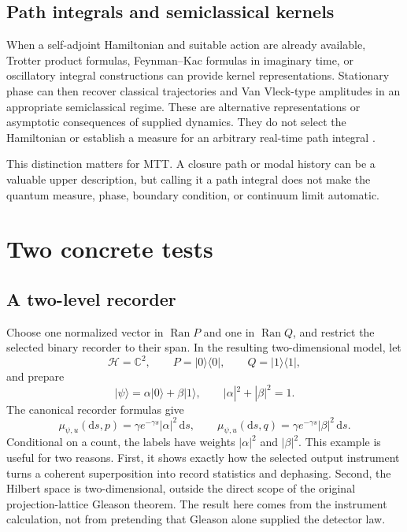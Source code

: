 \documentclass[11pt]{article}
\theoremstyle{definition}
\theoremstyle{remark}
\newcommand{\cH}{\mathcal H}
\newcommand{\dd}{\mathrm d}
\newcommand{\Ran}{\operatorname{Ran}}
\begin{document}
\subsection{Path integrals and semiclassical kernels}

When a self-adjoint Hamiltonian and suitable action are already available,
Trotter product formulas, Feynman--Kac formulas in imaginary time, or
oscillatory integral constructions can provide kernel representations.
Stationary phase can then recover classical trajectories and Van Vleck-type
amplitudes in an appropriate semiclassical regime.  These are alternative
representations or asymptotic consequences of supplied dynamics.  They do
not select the Hamiltonian or establish a measure for an arbitrary real-time
path integral \cite{ReedSimon1972,FeynmanHibbs1965}.

This distinction matters for MTT.  A closure path or modal history can be a
valuable upper description, but calling it a path integral does not make the
quantum measure, phase, boundary condition, or continuum limit automatic.

\section{Two concrete tests}
\label{sec:examples}

\subsection{A two-level recorder}

Choose one normalized vector in \(\Ran P\) and one in \(\Ran Q\), and
restrict the selected binary recorder to their span.  In the resulting
two-dimensional model, let
\[
\cH=\mathbb C^2,
\qquad
P=|0\rangle\langle0|,
\qquad
Q=|1\rangle\langle1|,
\]
and prepare
\[
|\psi\rangle=\alpha|0\rangle+\beta|1\rangle,
\qquad
|\alpha|^2+|\beta|^2=1.
\]
The canonical recorder formulas give
\[
\mu_{\psi,u}(\dd s,p)
=\gamma e^{-\gamma s}|\alpha|^2\,\dd s,
\qquad
\mu_{\psi,u}(\dd s,q)
=\gamma e^{-\gamma s}|\beta|^2\,\dd s.
\]
Conditional on a count, the labels have weights
\(|\alpha|^2\) and \(|\beta|^2\).  This example is useful for two reasons.
First, it shows exactly how the selected output instrument turns a coherent
superposition into record statistics and dephasing.  Second, the Hilbert
space is two-dimensional, outside the direct scope of the original
projection-lattice Gleason theorem.  The result here comes from the
instrument calculation, not from pretending that Gleason alone supplied the
detector law.
\end{document}
